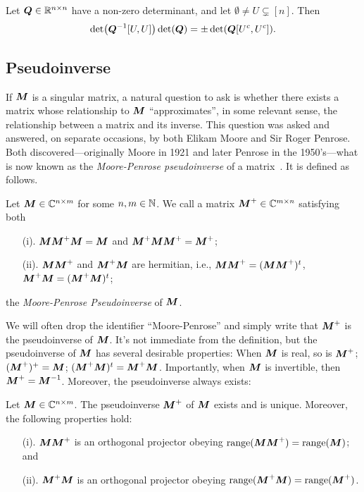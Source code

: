 \begin{lemma}
	\label{lem:sylvester}
	Let $\vb*{Q}\in\mathbb{R}^{n\times n}$ have a non-zero determinant, and let $\emptyset\neq U\subsetneq[n]$. Then 
	\begin{equation}
	\label{eq:sylvester}
	\det(\vb*{Q}^{-1}[U,U]) \det(\vb*{Q}) = \pm \det(\vb*{Q}[U^c,U^c]). 
	\end{equation}
\end{lemma}



\subsection{Pseudoinverse}
\label{sec:background_pseudoinverse}

If ${\vb*{M}}$ is a singular matrix, a natural question to ask is whether there exists a matrix whose relationship to ${\vb*{M}}$ ``approximates'', in some relevant sense, the relationship between a matrix and its inverse. This question  was asked and answered, on separate occasions, by both Elikam Moore and Sir Roger Penrose. Both discovered---originally Moore in 1921 and later Penrose in the 1950's---what is now known as the \emph{Moore-Penrose pseudoinverse} of a matrix~\cite{moore1920reciprocal, penrose1955generalized,penrose1956best}. It is defined as follows. 

\begin{definition}
\label{def:pseudoinverse}
Let ${\vb*{M}}\in\mathbb{C}^{n\times m}$ for some $n,m\in\mathbb{N}$. We call a matrix ${\vb*{M}}^+\in\mathbb{C}^{m\times n}$ satisfying both
\begin{enumerate}
    \item[(i).] ${\vb*{M}}{\vb*{M}}^+{\vb*{M}}={\vb*{M}}$ and ${\vb*{M}}^+{\vb*{M}}{\vb*{M}}^+={\vb*{M}}^+$;
    \item[(ii).] ${\vb*{M}}{\vb*{M}}^+$ and ${\vb*{M}}^+{\vb*{M}}$ are hermitian, i.e., ${\vb*{M}}{\vb*{M}}^+=({\vb*{M}}{\vb*{M}}^+)^t $, ${\vb*{M}}^+{\vb*{M}}=({\vb*{M}}^+{\vb*{M}})^t$; 
\end{enumerate}
the \emph{Moore-Penrose Pseudoinverse} of ${\vb*{M}}$. 
\end{definition}

We will often drop the identifier ``Moore-Penrose'' and simply write that ${\vb*{M}}^+$ is the pseudoinverse of ${\vb*{M}}$. It's not immediate from  the definition, but the pseudoinverse of ${\vb*{M}}$ has several desirable properties: When ${\vb*{M}}$ is real, so is ${\vb*{M}}^+$; $({\vb*{M}}^+)^+={\vb*{M}}$; $({\vb*{M}}^+{\vb*{M}})^t = {\vb*{M}}^+{\vb*{M}}$. Importantly, when ${\vb*{M}}$ is invertible, then ${\vb*{M}}^+={\vb*{M}}^{-1}$. Moreover, the pseudoinverse always exists: 

\begin{lemma}
	\label{lem:pseudoinverse_properties}
Let ${\vb*{M}}\in \mathbb{C}^{n\times m}$. The pseudoinverse  ${\vb*{M}}^+$ of ${\vb*{M}}$ exists and is unique. Moreover, the following properties hold: 
\begin{enumerate}
    \item[(i).] ${\vb*{M}}{\vb*{M}}^+$ is an orthogonal projector obeying $\textnormal{range}({\vb*{M}}{\vb*{M}}^+)=\textnormal{range}({\vb*{M}})$; and 
    \item[(ii).] ${\vb*{M}}^+{\vb*{M}}$ is an orthogonal projector obeying $\textnormal{range}({\vb*{M}}^+{\vb*{M}})=\textnormal{range}({\vb*{M}}^+)$. 
\end{enumerate}
\end{lemma}

